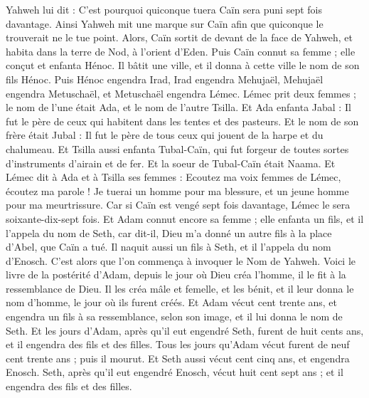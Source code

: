 \begin{multicols}{2}
Yahweh lui dit : C'est pourquoi quiconque tuera Caïn sera puni sept fois davantage. Ainsi Yahweh mit une marque sur Caïn afin que quiconque le trouverait ne le tue point.
Alors, Caïn sortit de devant de la face de Yahweh, et habita dans la terre de Nod, à l'orient d'Eden.
Puis Caïn connut sa femme ; elle conçut et enfanta Hénoc. Il bâtit une ville, et il donna à cette ville le nom de son fils Hénoc.
Puis Hénoc engendra Irad, Irad engendra Mehujaël, Mehujaël engendra Metuschaël, et Metuschaël engendra Lémec.
Lémec prit deux femmes ; le nom de l'une était Ada, et le nom de l'autre Tsilla.
Et Ada enfanta Jabal : Il fut le père de ceux qui habitent dans les tentes et des pasteurs.
Et le nom de son frère était Jubal : Il fut le père de tous ceux qui jouent de la harpe et du chalumeau.
Et Tsilla aussi enfanta Tubal-Caïn, qui fut forgeur de toutes sortes d'instruments d'airain et de fer. Et la soeur de Tubal-Caïn était Naama.
Et Lémec dit à Ada et à Tsilla ses femmes : Ecoutez ma voix femmes de Lémec, écoutez ma parole ! Je tuerai un homme pour ma blessure, et un jeune homme pour ma meurtrissure.
Car si Caïn est vengé sept fois davantage, Lémec le sera soixante-dix-sept fois.
Et Adam connut encore sa femme ; elle enfanta un fils, et il l'appela du nom de Seth, car dit-il, Dieu m'a donné un autre fils à la place d'Abel, que Caïn a tué.
Il naquit aussi un fils à Seth, et il l'appela du nom d'Enosch. C'est alors que l'on commença à invoquer le Nom de Yahweh.
\VerseOne{}Voici le livre de la postérité d'Adam, depuis le jour où Dieu créa l'homme, il le fit à la ressemblance de Dieu.
Il les créa mâle et femelle, et les bénit, et il leur donna le nom d'homme, le jour où ils furent créés.
Et Adam vécut cent trente ans, et engendra un fils à sa ressemblance, selon son image, et il lui donna le nom de Seth.
Et les jours d'Adam, après qu'il eut engendré Seth, furent de huit cents ans, et il engendra des fils et des filles.
Tous les jours qu'Adam vécut furent de neuf cent trente ans ; puis il mourut.
Et Seth aussi vécut cent cinq ans, et engendra Enosch.
Seth, après qu'il eut engendré Enosch, vécut huit cent sept ans ; et il engendra des fils et des filles.

\end{multicols}
